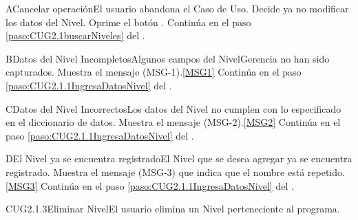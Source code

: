 		\begin{UCtrayectoriaA}{A}{Cancelar operación}{El usuario abandona el Caso de Uso.}
			\UCpaso[\UCactor] Decide ya no modificar los datos del Nivel.
			\UCpaso[\UCactor] Oprime el botón .
			\UCpaso Continúa en el paso \ref{paso:CUG2.1buscarNiveles} del .
		\end{UCtrayectoriaA}

	\begin{UCtrayectoriaA}{B}{Datos del Nivel Incompletos}{Algunos campos del NivelGerencia no han sido capturados.}
			\UCpaso Muestra el mensaje (MSG-1).\ref{MSG1}
			\UCpaso Continúa en el paso \ref{paso:CUG2.1.1IngresaDatosNivel} del .
	\end{UCtrayectoriaA}

	\begin{UCtrayectoriaA}{C}{Datos del Nivel Incorrectos}{Los datos del Nivel no cumplen con lo especificado en el diccionario de datos.}
			\UCpaso Muestra el mensaje (MSG-2).\ref{MSG2}
			\UCpaso Continúa en el paso \ref{paso:CUG2.1.1IngresaDatosNivel} del .
	\end{UCtrayectoriaA}

		\begin{UCtrayectoriaA}{D}{El Nivel ya se encuentra registrado}{El Nivel que se desea agregar ya se encuentra registrado.}
			\UCpaso Muestra el mensaje (MSG-3) que indica que el nombre está repetido.\ref{MSG3}
			\UCpaso Continúa en el paso \ref{paso:CUG2.1.1IngresaDatosNivel} del .
		\end{UCtrayectoriaA}

	\begin{UseCase}{CUG2.1.3}{Eliminar Nivel}{El usuario elimina un Nivel perteneciente al programa.}
	\end{UseCase}

